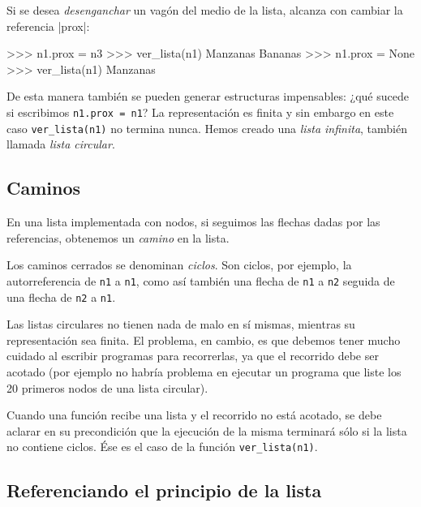 Si se desea {\it desenganchar} un vagón del medio de la lista, alcanza con
cambiar la referencia |prox|:

\begin{codigo-python-sn}
>>> n1.prox = n3
>>> ver_lista(n1)
Manzanas
Bananas
>>> n1.prox = None
>>> ver_lista(n1)
Manzanas
\end{codigo-python-sn}

De esta manera también se pueden generar estructuras impensables:
¿qué sucede si escribimos \lstinline!n1.prox = n1!? La representación es finita
y sin embargo en este caso \lstinline!ver_lista(n1)! no termina nunca. Hemos
creado una {\it lista infinita}, también llamada {\it lista circular}.


\subsection{Caminos}

En una lista implementada con nodos, si seguimos las flechas
dadas por las referencias, obtenemos un {\it camino} en la lista.

Los caminos cerrados se denominan {\it ciclos}. Son ciclos, por ejemplo, la
autorreferencia de \lstinline|n1| a \lstinline|n1|, como así también una
flecha de \lstinline|n1| a \lstinline|n2| seguida de una flecha de
\lstinline|n2| a \lstinline|n1|.

\begin{atencion}
Las listas circulares no tienen nada de malo en sí mismas,
mientras su representación sea finita. El problema, en cambio, es que debemos tener
mucho cuidado al escribir programas para recorrerlas, ya que el recorrido
debe ser acotado (por ejemplo no habría problema en ejecutar un programa
que liste los 20 primeros nodos de una lista circular).

Cuando una función recibe una lista y el recorrido no está acotado,
se debe aclarar en su precondición que la ejecución de la misma terminará
sólo si la lista no contiene ciclos. Ése es el caso de la función
\lstinline|ver_lista(n1)|.
\end{atencion}

\subsection{Referenciando el principio de la lista}

